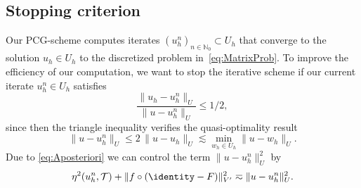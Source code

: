 \documentclass{amsart}
\providecommand{\tria}{\mathcal{T}}
\begin{document}
\subsection{Stopping criterion}\label{subsec:StoppingCriterion}
Our PCG-scheme computes iterates $(u_h^n)_{n\in \mathbb{N}_0} \subset U_h$ that converge to the solution $u_h \in U_h$ to the discretized problem in~\eqref{eq:MatrixProb}. To improve the efficiency of our computation, we want to stop the iterative scheme if our current iterate $u_h^n \in U_h$ satisfies
\begin{equation*}
\frac{\lVert u_h - u_h^n \rVert_U}{\lVert u - u_h^n \rVert_U} \leq 1/2,
\end{equation*}
since then the triangle inequality verifies the quasi-optimality result
\begin{equation*}
\lVert u - u_h^n \rVert_U \leq 2\, \lVert u - u_h \rVert_U \lesssim \min_{w_h\in U_h}\lVert u - w_h \rVert_U.
\end{equation*}
Due to \eqref{eq:Aposteriori} we can control the term $\lVert u - u_h^n \rVert^2_U$ by 
\begin{equation*}
\begin{aligned}
\eta^2(u_h^n,\tria) + \lVert f \circ (\identity - F)\rVert^2_{V'} \eqsim \lVert u - u_h^{n} \rVert^2_U.
\end{aligned}
\end{equation*}
\end{document}
